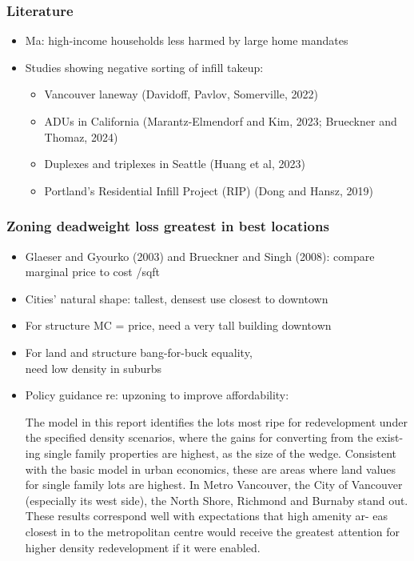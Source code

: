 \documentclass{beamer}
\begin{document}
\begin{frame}
	\frametitle{Literature}
	\begin{itemize}
		\item Ma: high-income households less harmed by large home mandates
		\item Studies showing negative sorting of infill takeup:
			\begin{itemize}
				\item Vancouver laneway (Davidoff, Pavlov, Somerville, 2022)
				\item ADUs in California (Marantz-Elmendorf and Kim, 2023; Brueckner and Thomaz, 2024)
				\item Duplexes and triplexes in Seattle (Huang et al, 2023)
				\item Portland's Residential Infill Project (RIP) (Dong and Hansz, 2019)
			\end{itemize}
	\end{itemize}
\end{frame}

\begin{frame}
	\frametitle{Zoning deadweight loss greatest in best locations}
	\begin{itemize}
		\item Glaeser and Gyourko (2003) and Brueckner and Singh (2008): compare marginal price to cost /sqft
		\item Cities' natural shape: tallest, densest use closest to downtown
		\item For structure MC = price, need a very tall building downtown
		\item For land and structure  bang-for-buck equality,\\ need low density in suburbs
		\item Policy guidance re: upzoning to improve affordability: \\\begin{tiny} The model in this report identifies the lots most ripe for redevelopment under
the specified density scenarios, where the gains for converting from the exist-
ing single family properties are highest, as the size of the wedge. Consistent
with the basic model in urban economics, these are areas where land values
for single family lots are highest. In Metro Vancouver, the City of Vancouver
(especially its west side), the North Shore, Richmond and Burnaby stand
out. These results correspond well with expectations that high amenity ar-
eas closest in to the metropolitan centre would receive the greatest attention
for higher density redevelopment if it were enabled.\end{tiny}
\end{itemize}
\end{frame}
\end{document}
